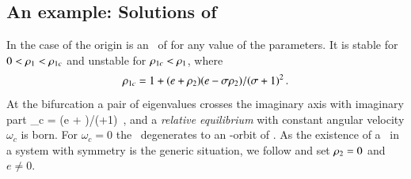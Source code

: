 \documentclass[preprint,number,sort&compress]{elsarticle}
\begin{document}
\subsection{\label{s:CLEsols} An example: Solutions of \cLe}

In the case of {\cLe}  the origin  is an \eqv\ of
 for any value of the parameters. It is stable
for $0<\rho_1<\rho_{1c}$ and unstable for
$\rho_{1c}<\rho_1$, where
\[
	\rho_{1c} = 1 + {(e+\rho_2)(e-\sigma \rho_2)}/{(\sigma+1)^2}
\,.
\]
At the bifurcation a pair of eigenvalues crosses
the imaginary axis with imaginary part
\beq
	\omega_c = {\sigma (e + \ImrCLor)}/{(\sigma+1)}
\,,
and a \emph{relative equilibrium}  with constant
angular velocity $\omega_c$ is born. For $\omega_c =0$ the
\reqv\ degenerates to an -orbit of \eqva. As the
existence of a \reqv\ in a system with  symmetry is
the generic situation, we follow 
and set $\rho_2=0$ and $e \neq 0$.
\end{document}
